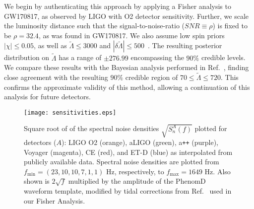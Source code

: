 \documentclass[prd,twocolumn,nofootinbib,superscriptaddress,amsmath,amssymb]{revtex4-1}
\begin{document}
We begin by authenticating this approach by applying a Fisher analysis to GW170817, as observed by LIGO with O2 detector sensitivity.
Further, we scale the luminosity distance such that the signal-to-noise-ratio ($SNR \equiv \rho$) is fixed to be $\rho=32.4$, as was found in GW170817.
We also assume low spin priors $|\chi| \leq 0.05$, as well as $\tilde{\Lambda} \leq 3000$ and $|\delta \tilde{\Lambda}| \leq 500$~\cite{Wade:LambdaPriors}.
The resulting posterior distribution on $\tilde{\Lambda}$ has a range of $\pm 276.99$ encompassing the $90\%$ credible levels.
We compare these results with the Bayesian analysis performed in Ref.~\cite{TheLIGOScientific:2017qsa,Abbott2018}, finding close agreement with the resulting $90\%$ credible region of $70 \leq \tilde{\Lambda} \leq 720$.
This confirms the approximate validity of this method, allowing a continuation of this analysis for future detectors.
\begin{figure}
\begin{center} 
\texttt{[image: sensitivities.eps]}
\end{center}
\caption{
Square root of of the spectral noise densities $\sqrt{S_n^A(f)}$ plotted for detectors ($A$): LIGO O2 (orange), aLIGO (green), a\texttt{++} (purple), Voyager (magenta), CE (red), and ET-D (blue) as interpolated from publicly available data.
Spectral noise densities are plotted from $f_{\text{min}}=(23,10,10,7,1,1) \text{ Hz}$, respectively, to $f_{\text{max}}=1649 \text{ Hz}$.
Also shown is $2 \sqrt{f}$ multiplied by the amplitude of the PhenomD~\cite{PhenomDI,PhenomDII} waveform template, modified by tidal corrections from Ref.~\cite{Wade:tidalCorrections} used in our Fisher Analysis.
}
\label{fig:sensitivities}
\end{figure}
\end{document}
